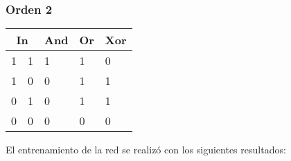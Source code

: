 
\subsubsection{Orden 2}
\begin{table}[H]
    \centering
    \begin{tabular}{|ll|l|l|l|}
    \hline
    \multicolumn{2}{|c|}{\textbf{In}} & \multicolumn{1}{c|}{\textbf{And}} & \multicolumn{1}{c|}{\textbf{Or}} & \multicolumn{1}{c|}{\textbf{Xor}} \\ \hline
    \multicolumn{1}{|l|}{1}    & 1    & 1                                 & 1                                & 0                                 \\ \hline
    \multicolumn{1}{|l|}{1}    & 0    & 0                                 & 1                                & 1                                 \\ \hline
    \multicolumn{1}{|l|}{0}    & 1    & 0                                 & 1                                & 1                                 \\ \hline
    \multicolumn{1}{|l|}{0}    & 0    & 0                                 & 0                                & 0                                 \\ \hline
    \end{tabular}
\end{table}
El entrenamiento de la red se realizó con los siguientes resultados:
